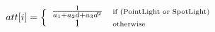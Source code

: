\documentclass{article}
\begin{document}
$$
att[i]=\Big\{
\begin{array}{clcr}
\frac{1}{a_1+a_2 d+a_3 d^2} & \scriptsize \textrm{if (PointLight or SpotLight)} \\
1 & \scriptsize \textrm{otherwise}
\end{array}
$$
\end{document}
